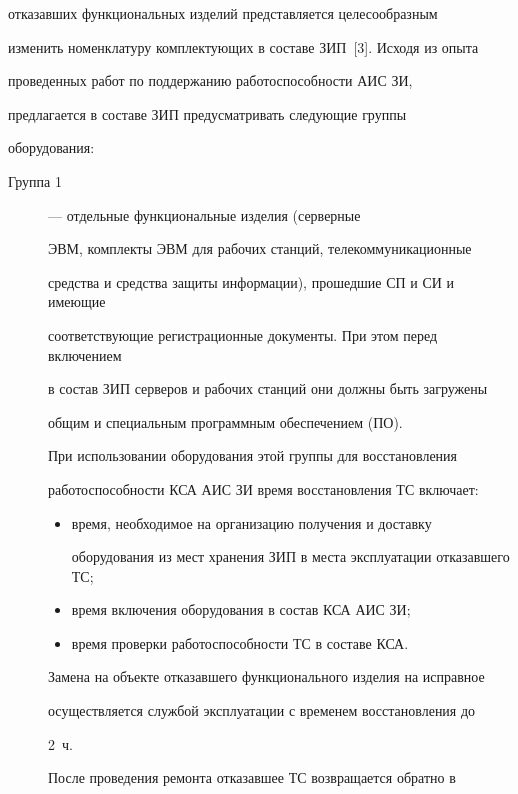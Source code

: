 отказавших функциональных изделий представляется целесообразным

изменить номенклатуру комплектующих в составе ЗИП~[3]. Исходя из опыта

проведенных работ по поддержанию работоспособности АИС ЗИ,

предлагается в составе ЗИП предусматривать следующие группы

оборудования:

\begin{description}

\item[Группа 1] --- отдельные функциональные изделия (серверные

ЭВМ, комплекты ЭВМ для рабочих станций, телекоммуникационные

средства и средства защиты информации), прошедшие СП и СИ и имеющие

соответствующие регистрационные документы. При этом перед включением

в состав ЗИП серверов и рабочих станций они должны быть загружены

общим и специальным программным обеспечением (ПО).



     При использовании оборудования этой группы для восстановления

работоспособности КСА АИС ЗИ время восстановления ТС включает:

     \begin{itemize}

     \item время, необходимое на организацию получения и доставку

оборудования из мест хранения ЗИП в места эксплуатации отказавшего ТС;

     \item время включения оборудования в состав КСА АИС ЗИ;

     \item время проверки работоспособности ТС в составе КСА.

     \end{itemize}



     Замена на объекте отказавшего функционального изделия на исправное

осуществляется службой эксплуатации с временем восстановления до

2~ч.



     После проведения ремонта отказавшее ТС возвращается обратно в


\end{description}
